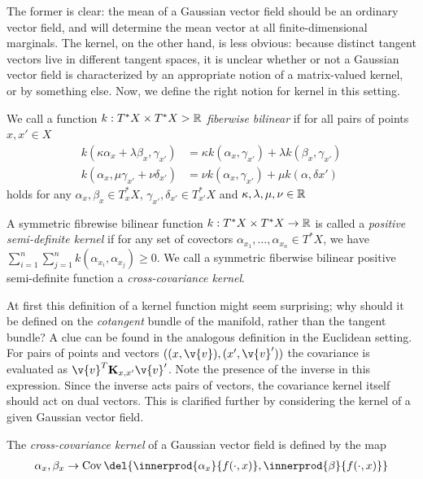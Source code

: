 The former is clear: the mean of a Gaussian vector field should be an ordinary vector field, and will determine the mean vector at all finite-dimensional marginals.
The kernel, on the other hand, is less obvious: because distinct tangent vectors live in different tangent spaces, it is unclear whether or not a Gaussian vector field is characterized by an appropriate notion of a matrix-valued kernel, or by something else.
Now, we define the right notion for kernel in this setting.

\begin{definition}
	We call a function $k : T^*X \times T^*X \-> \mathbb{R}$ \emph{fiberwise bilinear} if for all pairs of points $x, x' \in X$
	\begin{align}
		k(\kappa \alpha_x + \lambda \beta_x, \gamma_{x'}) & = \kappa k(\alpha_x, \gamma_{x'}) + \lambda k(\beta_x, \gamma_{x'}) \\
		k( \alpha_x, \mu \gamma_{x'} + \nu \delta_{x'})   & = \nu k(\alpha_x, \gamma_{x'}) + \mu k(\alpha, \delta{x'})
	\end{align}
	holds for any $\alpha_x, \beta_x \in T^*_x X$, $\gamma_{x'}, \delta_{x'} \in T^*_{x'}
		X$ and $\kappa, \lambda, \mu, \nu \in \mathbb{R}$ \end{definition} 

\begin{definition} A symmetric fibrewise bilinear function $k: T^*X \times T^*X \to \mathbb{R}$ is called a \emph{positive semi-definite kernel} if for any set of covectors $\alpha_{x_1}, \ldots, \alpha_{x_n} \in T^*X$, we have $\sum_{i=1}^n\sum_{j=1}^n k(\alpha_{x_i}, \alpha_{x_j}) \geq 0$.
	We call a symmetric fiberwise bilinear positive semi-definite function a \emph{cross-covariance kernel}.
\end{definition}

At first this definition of a kernel function might seem surprising; why should it be defined on the \emph{cotangent} bundle of the manifold, rather than the tangent bundle?
A clue can be found in the analogous definition in the Euclidean setting.
For pairs of points and vectors $((x,\v{v}),(x',\v{v}'))$ the covariance is evaluated as $\v{v}^T\m{K}_{x,x'}\v{v}'$.
Note the presence of the inverse in this expression.
Since the inverse acts pairs of vectors, the covariance kernel itself should act on dual vectors.
This is clarified further by considering the kernel of a given Gaussian vector field.

\begin{definition}
	The \emph{cross-covariance kernel} of a Gaussian vector field is defined by the map
	\begin{align}
		\alpha_x, \beta_x \to \Cov \del{ \innerprod{\alpha_x}{f(\cdot, x)}, \innerprod{\beta}{f(\cdot, x)} }
	\end{align}
\end{definition}

